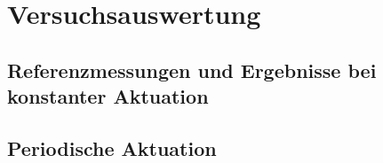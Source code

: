 \chapter{Versuchsauswertung}\label{s:auswertung}

\section{Referenzmessungen und Ergebnisse bei konstanter Aktuation}
\label{sec:ErgebnisseKonstanteAktuation}

\section{Periodische Aktuation}


%
%
%
%
%
%
